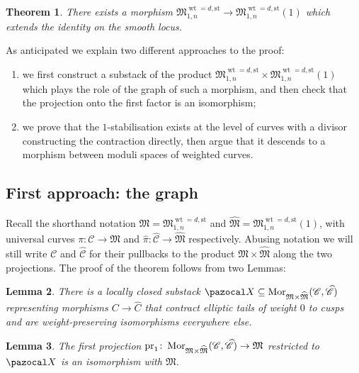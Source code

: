 \documentclass[11pt]{amsart}
\renewcommand{\to}{\rightarrow}
\newcommand{\pr}{\rm{pr}}
\newcommand{\X}{\pazocal X}
\newcommand{\cC}{\mathcal C}
\newcommand{\hC}{\widehat{\mathcal C}}
\newcommand{\MM}{\mathfrak M}
\newcommand{\hM}{\widehat{\mathfrak M}}
\theoremstyle{plain}
\newtheorem{thm}{Theorem}[section]
\newtheorem{lem}[thm]{Lemma}
\theoremstyle{definition}
\begin{document}

\begin{thm}
There exists a morphism $\mathfrak M_{1,n}^{\operatorname{wt}=d,\text{st}}\to\mathfrak M_{1,n}^{\operatorname{wt}=d,\text{st}}(1)$ which extends the identity on the smooth locus.
\end{thm} 
As anticipated we explain two different approaches to the proof:
\begin{enumerate}
 \item we first construct a substack of the product $\mathfrak M_{1,n}^{\operatorname{wt}=d,\text{st}}\times\mathfrak M_{1,n}^{\operatorname{wt}=d,\text{st}}(1)$ which plays the role of the graph of such a morphism, and then check that the projection onto the first factor is an isomorphism;
\item we prove that the $1$-stabilisation exists at the level of curves with a divisor constructing the contraction directly, then argue that it descends to a morphism between moduli spaces of weighted curves.
\end{enumerate}

\subsection{First approach: the graph}

Recall the shorthand notation $\MM=\mathfrak M_{1,n}^{\operatorname{wt}=d,\text{st}}$ and $\hM=\mathfrak M_{1,n}^{\operatorname{wt}=d,\text{st}}(1)$, with universal curves $\pi\colon \cC\to \MM$ and $\hat\pi\colon\hC\to\hM$ respectively. Abusing notation we will still write $\cC$ and $\hC$ for their pullbacks to the product $\MM\times\hM$ along the two projections. The proof of the theorem follows from two Lemmas:

\begin{lem}\label{lemma:def_X}
 There is a locally closed substack $\X\subseteq\operatorname{Mor}_{\MM\times\hM}(\cC,\hC)$ representing morphisms $C\to \widehat{C}$ that contract elliptic tails of weight $0$ to cusps and are weight-preserving isomorphisms everywhere else. 
\end{lem}

\begin{lem}\label{lamma:projection_iso}
 The first projection $\pr_1\colon \operatorname{Mor}_{\MM\times\hM}(\cC,\hC)\to\MM$ restricted to $\X$ is an isomorphism with $\MM$.
\end{lem}
\end{document}
